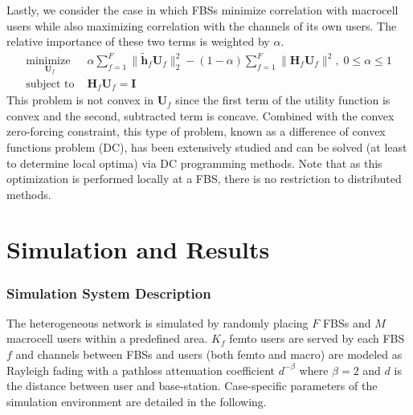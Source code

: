 \par
Lastly, we consider the case in which FBSs minimize correlation with macrocell users while also maximizing correlation with the channels of its own users. The relative importance of these two terms is weighted by $\alpha.$
    \begin{equation}
    \begin{array}{ll}
    \underset{\mathbf{U}_{f} }{\text{minimize }}   & \alpha\sum^F_{f=1} \|\tilde{\mathbf{h}}_{f}  \mathbf{U}_{f}\|^2_2
    -
    (1-\alpha)\sum^F_{f=1} \|\mathbf{H}_{f}  \mathbf{U}_{f}\|^2, \; 0\leq \alpha \leq 1
    \\
    \mbox{subject to } & \mathbf{H}_{f}  \mathbf{U}_{f} = \mathbf{I}
    \end{array}
    \label{e-opt-prob}
    \end{equation}
    This problem is not convex in $\mathbf{U}_{f}$ since the first term of the utility function is convex and the second, subtracted term is concave. Combined with the convex zero-forcing constraint, this type of problem, known as a difference of convex functions problem (DC), has been extensively studied and can be solved (at least to determine local optima) via DC programming methods. Note that as this optimization is performed locally at a FBS, there is no restriction to distributed methods.
     


\chapter{Simulation and Results}\label{numerical}
\subsection{Simulation System Description}
The heterogeneous network is simulated by randomly placing $F$ FBSs and $M$ macrocell users within a predefined area. $K_{f}$ femto users are served by each FBS $f$ and channels between FBSs and users (both femto and macro) are modeled as Rayleigh fading with a pathloss attenuation coefficient $d^{- \beta}$ where $\beta=2$ and $d$ is the distance between user and base-station. Case-specific parameters of the simulation environment are detailed in the following.

